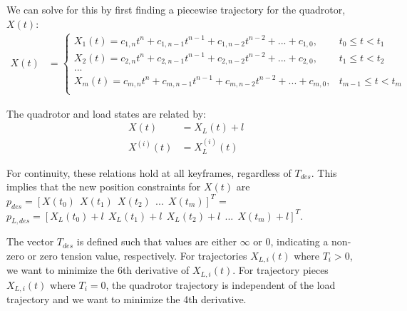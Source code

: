 \documentclass[11pt]{article}
\begin{document}
We can solve for this by first finding a piecewise trajectory for the quadrotor, $X(t)$:
\begin{align*}
X(t) &= 
\begin{cases}
    X_{1} (t) = c_{1, n} t^n + c_{1, n-1} t^{n-1} + c_{1, n-2} t^{n-2} + ... + c_{1, 0}, & t_0 \le t < t_1 \\
    X_{2} (t) = c_{2, n} t^n + c_{2, n-1} t^{n-1} + c_{2, n-2} t^{n-2} + ... + c_{2, 0}, & t_1 \le t < t_2 \\
    ... \\
    X_{m} (t) = c_{m, n} t^n + c_{m, n-1} t^{n-1} + c_{m, n-2} t^{n-2} + ... + c_{m, 0}, & t_{m-1} \le t < t_m \\
\end{cases}
\end{align*}

The quadrotor and load states are related by:
\begin{align*}
X(t) &= X_{L}(t)+l \\
X^{(i)}(t) &= X^{(i)}_L (t) 
\end{align*}

For continuity, these relations hold at all keyframes, regardless of $T_{des}$. This implies that the new position constraints for $X(t)$ are $p_{des} = [X(t_0) \ \ X(t_1) \ \ X(t_2) \ \ ... \ \ X(t_m)]^T$ = $p_{L, des} = [X_L(t_0)+l \ \ X_L(t_1)+l \ \ X_L(t_2)+l \ \ ... \ \ X(t_m)+l]^T$. 

\mbox{}\newline
The vector $T_{des}$ is defined such that values are either $\infty$ or $0$, indicating a non-zero or zero tension value, respectively.  For trajectories $X_{L, i}(t)$ where $T_i > 0$, we want to minimize the 6th derivative of $X_{L, i}(t)$. For trajectory pieces $X_{L, i}(t)$ where $T_i = 0$, the quadrotor trajectory is independent of the load trajectory and we want to minimize the 4th derivative. 
\end{document}
